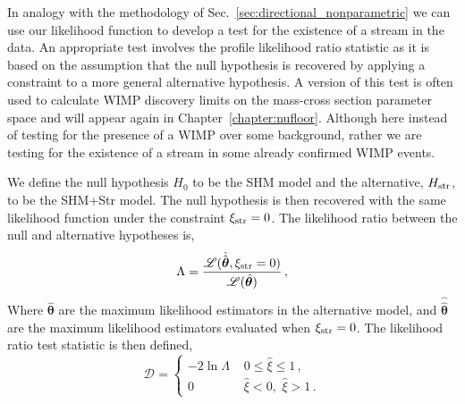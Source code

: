 In analogy with the methodology of Sec.~\ref{sec:directional_nonparametric} we can use our likelihood function to develop a test for the existence of a stream in the data.  
An appropriate test involves the profile likelihood ratio statistic as it is based on the assumption that the null hypothesis is recovered by applying a constraint to a more general alternative hypothesis. A version of this test is often used to calculate WIMP discovery limits on the mass-cross section parameter space and will appear again in Chapter~\ref{chapter:nufloor}. Although here instead of testing for the presence of a WIMP over some background, rather we are testing for the existence of a stream in some already confirmed WIMP events.

We define the null hypothesis $H_0$ to be the SHM model and the alternative, $H_{\rm str}$, to be the SHM+Str model. The null hypothesis is then recovered with the same likelihood function under the constraint $\xi_{\rm str} = 0$. The likelihood ratio between the null and alternative hypotheses is,
\begin{equation}
	\Lambda = \frac{\mathscr{L}(\hat{\hat{\boldsymbol{\theta}}}, \xi_{\rm str} = 0)}{\mathscr{L}(\hat{\boldsymbol{\theta}} )} \, ,
\end{equation}
Where $\hat{\boldsymbol{\theta}}$ are the maximum likelihood estimators in the alternative model, and $\hat{\hat{\boldsymbol{\theta}}}$ are the maximum likelihood estimators evaluated when $\xi_{\rm str} = 0$. The likelihood ratio test statistic is then defined,
\begin{equation}
	\mathcal{D} = \left\{ \begin{array}{rl}
	-2\ln \Lambda  & \, \, 0\le \hat{\xi}\le1 \,,\\
	0  & \, \, \hat{\xi}<0, \, \, \hat{\xi}>1 \,.
	\end{array} \right. 
\end{equation}

